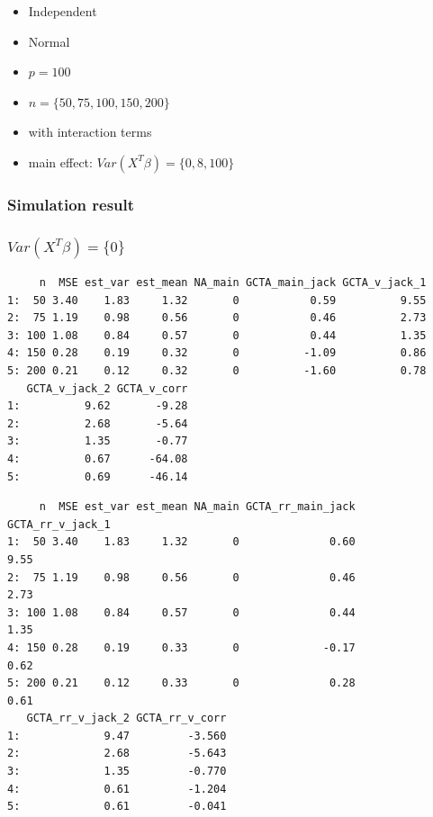\documentclass[]{article}
\providecommand{\tightlist}{%
  \setlength{\itemsep}{0pt}\setlength{\parskip}{0pt}}
\begin{document}
\begin{itemize}
\tightlist
\item
  Independent
\item
  Normal
\item
  \(p = 100\)
\item
  \(n = \{50, 75,100, 150, 200\}\)
\item
  with interaction terms
\item
  main effect: \(Var(X^T\beta) = \{0,8,100\}\) \newpage
\end{itemize}

\subsubsection{Simulation result}\label{simulation-result}

\subsubsection{\texorpdfstring{\(Var(X^T\beta) = \{0\}\)}{Var(X\^{}T\textbackslash{}beta) = \textbackslash{}\{0\textbackslash{}\}}}\label{varxtbeta-0}

\begin{verbatim}
     n  MSE est_var est_mean NA_main GCTA_main_jack GCTA_v_jack_1
1:  50 3.40    1.83     1.32       0           0.59          9.55
2:  75 1.19    0.98     0.56       0           0.46          2.73
3: 100 1.08    0.84     0.57       0           0.44          1.35
4: 150 0.28    0.19     0.32       0          -1.09          0.86
5: 200 0.21    0.12     0.32       0          -1.60          0.78
   GCTA_v_jack_2 GCTA_v_corr
1:          9.62       -9.28
2:          2.68       -5.64
3:          1.35       -0.77
4:          0.67      -64.08
5:          0.69      -46.14
\end{verbatim}

\begin{verbatim}
     n  MSE est_var est_mean NA_main GCTA_rr_main_jack GCTA_rr_v_jack_1
1:  50 3.40    1.83     1.32       0              0.60             9.55
2:  75 1.19    0.98     0.56       0              0.46             2.73
3: 100 1.08    0.84     0.57       0              0.44             1.35
4: 150 0.28    0.19     0.33       0             -0.17             0.62
5: 200 0.21    0.12     0.33       0              0.28             0.61
   GCTA_rr_v_jack_2 GCTA_rr_v_corr
1:             9.47         -3.560
2:             2.68         -5.643
3:             1.35         -0.770
4:             0.61         -1.204
5:             0.61         -0.041
\end{verbatim}
\end{document}
